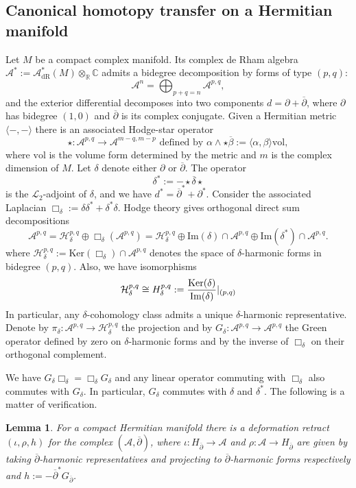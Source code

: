 \documentclass[a4paper]{amsart}
\newtheorem{lemm}[theo]{Lemma}
\theoremstyle{definition}
\theoremstyle{theorem}
\newcommand{\CC}{\mathbb{C}}
\newcommand{\RR}{\mathbb{R}}
\newcommand{\Aa}{\mathcal{A}}
\newcommand{\Hh}{\mathcal{H}}
\newcommand{\Ll}{\mathcal{L}}
\newcommand{\Ker}{\mathrm{Ker}}
\newcommand{\Img}{\mathrm{Im}}
\newcommand{\ov}{\overline}
\newcommand{\del}{\partial}
\newcommand{\delb}{{\overline\partial}}
\newcommand{\lra}{\longrightarrow}
\begin{document}
\subsection{Canonical homotopy transfer on a Hermitian manifold}
Let $M$ be a compact complex manifold. Its
 complex de Rham algebra 
$\Aa^*:=\Aa^*_{\mathrm{dR}}(M)\otimes_\RR\CC$ admits a bidegree decomposition by forms of type $(p,q)$:
\[\Aa^n=\bigoplus_{p+q=n} \Aa^{p,q},\]
and the exterior differential decomposes into two components $d=\del+\delb$, where $\del$ has bidegree $(1,0)$ and $\delb$ is its complex conjugate.
Given a Hermitian metric $\langle-,-\rangle$ there is an associated Hodge-star operator 
\[\star:\Aa^{p,q}\lra \Aa^{m-q,m-p}\text{ defined by }\alpha\wedge \star \ov{\beta}:=\langle\alpha,\beta\rangle\mathrm{vol},\]
where  $\mathrm{vol}$
is the volume form determined by the metric and $m$ is the complex dimension of $M$. Let $\delta$ denote either $\del$ or $\delb$. The operator
 \[\delta^*:=-\star \ov{\delta} \star\] 
is the  $\Ll_2$-adjoint  of $\delta$, and we have $d^*=\delb^*+\del^*$.
Consider the associated Laplacian $\Box_\delta:=\delta\delta^*+\delta^*\delta$.
Hodge theory gives orthogonal direct sum decompositions 
\[\Aa^{p,q}=\Hh_\delta^{p,q}\oplus \Box_\delta(\Aa^{p,q})=\Hh_\delta^{p,q}\oplus\Img(\delta)\cap \Aa^{p,q}\oplus \Img(\delta^*)\cap \Aa^{p,q}.\]
where $\Hh_\delta^{p,q}:=\Ker(\Box_\delta)\cap \Aa^{p,q}$ denotes the space of $\delta$-harmonic forms in bidegree $(p,q)$.
Also, we have isomorphisms 
\[\Hh_\delta^{p,q}\cong H_\delta^{p,q}:={\Ker(\delta) \over \Img(\delta)}|_{(p,q)}\]
In particular, any $\delta$-cohomology class admits a unique $\delta$-harmonic representative.
Denote by $\pi_\delta:\Aa^{p,q}\to \Hh_\delta^{p,q}$ the projection and by 
$G_\delta:\Aa^{p,q}\to \Aa^{p,q}$ the Green operator defined by zero on $\delta$-harmonic forms and by the inverse of $\Box_\delta$  on their orthogonal complement. 

We have $G_\delta\Box_\delta=\Box_\delta G_\delta$ 
and any linear operator commuting with $\Box_\delta$ also commutes with $G_\delta$.
In particular, $G_\delta$ commutes with $\delta$ and $\delta^*$.
The following is a matter of verification.

\begin{lemm}\label{httDol} For a compact Hermitian manifold there is a deformation retract
$(\iota,\rho,h)$ for the complex $(\Aa,\delb)$,
where $\iota:H_\delb\to \Aa$ and $\rho:\Aa\to H_\delb$ are given by taking $\delb$-harmonic representatives and projecting to $\delb$-harmonic forms respectively and
 $h:=-\delb^* G_\delb$.
\end{lemm}
\end{document}
